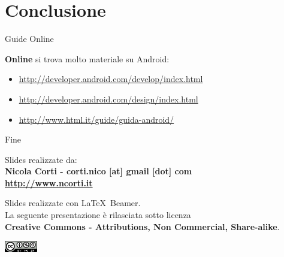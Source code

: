 \documentclass[xcolor=svgnames,11pt]{beamer}
\begin{document}
\section{Conclusione}

\begin{frame}{Guide Online}

\textbf{Online} si trova molto materiale su Android:
\pause
\medskip
\begin{itemize}
\item \small{\url{http://developer.android.com/develop/index.html}}
\pause
\item \url{http://developer.android.com/design/index.html}
\pause
\item \url{http://www.html.it/guide/guida-android/}
\end{itemize}
\end{frame}




\begin{frame}{Fine}

\begin{center}
		Slides realizzate da:\\
		\medskip
		\textbf{Nicola Corti - corti.nico [at] gmail [dot] com}\\
		\textbf{\url{http://www.ncorti.it}}\\
		\medskip
\end{center}
		\medskip
		Slides realizzate con \LaTeX\ Beamer.\\
		\medskip
		La seguente presentazione \`e rilasciata sotto licenza\\
		\textbf{Creative Commons - Attributions, Non Commercial, Share-alike}.
		\begin{center}
			\includegraphics[height=0.5cm]{cc.png}
		\end{center}

\end{frame}
\end{document}
